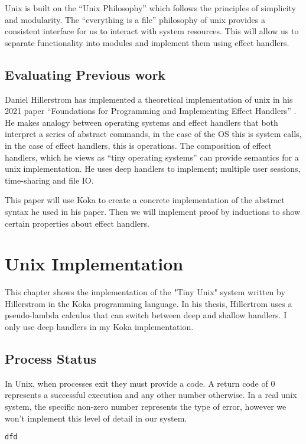 \documentclass[logo,bsc,singlespacing,parskip]{infthesis}
\begin{document}
Unix is built on the “Unix Philosophy” which follows the principles of simplicity and modularity. The “everything is a file” philosophy of unix provides a consistent interface for us to interact with system resources. This will allow us to separate functionality into modules and implement them using effect handlers.

\section{Evaluating Previous work}
Daniel Hillerstrom has implemented a theoretical implementation of unix in his 2021 paper “Foundations for Programming and Implementing Effect Handlers” \cite{hillerstrom_foundations_nodate}. He makes analogy between operating systems and effect handlers that both interpret a series of abstract commands, in the case of the OS this is system calls, in the case of effect handlers, this is operations. The composition of effect handlers, which he views as “tiny operating systems” can provide semantics for a unix implementation. He uses deep handlers to implement; multiple user sessions, time-sharing and file IO.

This paper will use Koka to create a concrete implementation of the abstract syntax he used in his paper. Then we will implement proof by inductions to show certain properties about effect handlers.

\chapter{Unix Implementation}
This chapter shows the implementation of the "Tiny Unix" system written by Hillerstrom in the Koka programming language. In his thesis, Hillertrom uses a pseudo-lambda calculus that can switch between deep and shallow handlers. I only use deep handlers in my Koka implementation.

\section{Process Status}
In Unix, when processes exit they must provide a code. A return code of 0 represents a successful execution and any other number otherwise. In a real unix system, the specific non-zero number represents the type of error, however we won't implement this level of detail in our system.


\begin{lstlisting}
dfd
\end{lstlisting}
\end{document}
